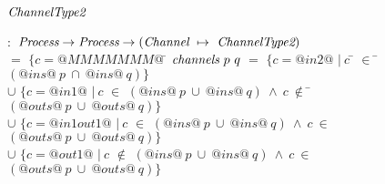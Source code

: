\begin{figure*}

\begin{minipage}{0.45\textwidth}
\begin{tabbing}
$\textit{ChannelType2}$   \TABDEF \kill

 \> $:$ \> $\textit{Process} \to \textit{Process} \to (\textit{Channel} ~\mapsto~ \textit{ChannelType2})$ \\

  \> $=$    \> $\{ c=@MMMMMMM@~$\= \kill
$\textit{channels}~p~q$
  \> $=$    \> $\{ c=@in2@$
            \> $|~c$ \= $\in$ \= $(@ins@~p~\cap~@ins@~q) \}$ 
            \\

  \> $\cup$ \> $\{ c=@in1@$
            \> $ |~c$ \> $\in$ \> $(@ins@~p~\cup~@ins@~q)~\wedge~c~\not\in$ \= $(@outs@~p~\cup~@outs@~q) \}$ \\

  \> $\cup$ \> $\{ c=@in1out1@$
            \> $|~c$ \> $\in$ \> $(@ins@~p~\cup~@ins@~q)~\wedge~c~\in$ \> $(@outs@~p~\cup~@outs@~q) \}$ \\

  \> $\cup$ \> $\{ c=@out1@$
            \> $ |~c$ \> $\not\in$ \> $(@ins@~p~\cup~@ins@~q)~\wedge~c~\in$ \> $(@outs@~p~\cup~@outs@~q) \}$ 
\end{tabbing}
\end{minipage}

\newcommand\funClauseDef[3]
{ $\ti{#1}~(#2)$ \> $=$ \> $#3$
}
\newcommand\outlabelsDef[2]
{ \funClauseDef{outlabels}{#1}{\sgl{#2}} 
}


\end{figure*}
